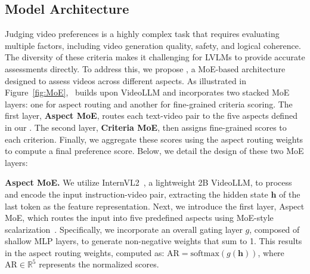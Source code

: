 


\subsection{Model Architecture}\label{sec:moe_arch}

Judging video preferences is a highly complex task that requires evaluating multiple factors, including video generation quality, safety, and logical coherence. The diversity of these criteria makes it challenging for LVLMs to provide accurate assessments directly. To address this, we propose \algname, a MoE-based architecture designed to assess videos across different aspects. As illustrated in Figure~\ref{fig:MoE}, \algname\ builds upon VideoLLM and incorporates two stacked MoE layers: one for aspect routing and another for fine-grained criteria scoring. The first layer, \textbf{Aspect MoE}, routes each text-video pair to the five aspects defined in our \datasetname. The second layer, \textbf{Criteria MoE}, then assigns fine-grained scores to each criterion. Finally, we aggregate these scores using the aspect routing weights to compute a final preference score. Below, we detail the design of these two MoE layers:

\noindent \textbf{Aspect MoE.}
We utilize InternVL2~\cite{chen2023internvl}, a lightweight 2B VideoLLM, to process and encode the input instruction-video pair, extracting the hidden state \(\mathbf{h}\) of the last token as the feature representation.
Next, we introduce the first layer, Aspect MoE, which routes the input into five predefined aspects using MoE-style scalarization~\cite{armoreward}. 
Specifically, we incorporate an overall gating layer $g$, composed of shallow MLP layers, to generate non-negative weights that sum to 1. This results in the aspect routing weights, computed as: $\textrm{AR} = \text{softmax} (g(\mathbf{h}))$, where $\textrm{AR}\in \mathbb{R}^5$ represents the normalized scores.

